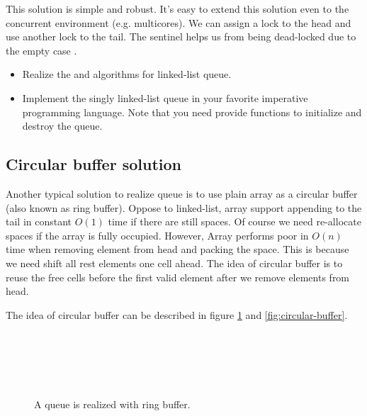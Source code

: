 \documentclass{article}
\begin{document}
This solution is simple and robust. It's easy to extend this solution
even to the concurrent environment (e.g. multicores). We can assign
a lock to the head and use another lock to the tail. The sentinel
helps us from being dead-locked due to the empty case \cite{PODC96} \cite{SutterDDJ}.

\begin{Exercise}
\begin{itemize}
\item Realize the  and  algorithms
for linked-list queue.

\item Implement the singly linked-list queue in your favorite imperative
programming language. Note that you need provide functions to initialize
and destroy the queue.
\end{itemize}
\end{Exercise}

\subsection{Circular buffer solution}

Another typical solution to realize queue is to use plain array as
a circular buffer (also known as ring buffer).
Oppose to linked-list, array support appending to the
tail in constant $O(1)$ time if there are still spaces. Of course
we need re-allocate spaces if the array is fully occupied. However,
Array performs poor in $O(n)$ time when removing element from head
and packing the space. This is because we need shift all rest elements
one cell ahead. The idea of circular buffer is to reuse the free
cells before the first valid element after we remove elements from
head.

The idea of circular buffer can be described in figure \ref{fig:circular-buffer-queue}
and \ref{fig:circular-buffer}.

\begin{figure}[htbp]
 \centering
  \\
  \\
  \\
  \\
 \caption{A queue is realized with ring buffer.} \label{fig:circular-buffer-queue}
\end{figure}
\end{document}
